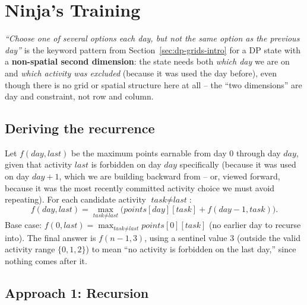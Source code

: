 \section{Ninja's Training}
\label{sec:dp-ninja-training}


\begin{patternbox}
\emph{``Choose one of several options each day, but not the same option
as the previous day''} is the keyword pattern from
Section~\ref{sec:dp-grids-intro} for a DP state with a \textbf{non-spatial
second dimension}: the state needs both \emph{which day} we are on and
\emph{which activity was excluded} (because it was used the day before),
even though there is no grid or spatial structure here at all -- the
``two dimensions'' are day and constraint, not row and column.
\end{patternbox}

\subsection*{Deriving the recurrence}

Let $f(\textit{day}, \textit{last})$ be the maximum points earnable from
day $0$ through day $\textit{day}$, given that activity $\textit{last}$
is forbidden on day $\textit{day}$ specifically (because it was used on
day $\textit{day}+1$, which we are building backward from -- or, viewed
forward, because it was the most recently committed activity choice we
must avoid repeating). For each candidate activity $\textit{task} \ne
\textit{last}$:
\[
  f(\textit{day}, \textit{last}) = \max_{\textit{task} \ne \textit{last}}
  \Big(\textit{points}[\textit{day}][\textit{task}] +
  f(\textit{day}-1, \textit{task})\Big).
\]
Base case: $f(0, \textit{last}) = \max_{\textit{task} \ne \textit{last}}
\textit{points}[0][\textit{task}]$ (no earlier day to recurse into). The
final answer is $f(n-1, 3)$, using a sentinel value $3$ (outside the
valid activity range $\{0,1,2\}$) to mean ``no activity is forbidden on
the last day,'' since nothing comes after it.

\subsection*{Approach 1: Recursion}

